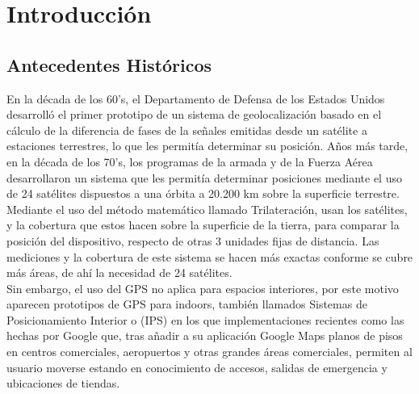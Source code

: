 \chapter{Introducción}

\section{Antecedentes Históricos}

En la década de los 60's, el Departamento de Defensa de los Estados Unidos desarrolló el primer prototipo de un sistema de geolocalización basado en el cálculo de la diferencia de fases de la señales emitidas desde un satélite a estaciones terrestres, lo que les permitía determinar su posición. Años más tarde, en la década de los 70's, los programas de la armada y de la Fuerza Aérea desarrollaron un sistema que les permitía determinar posiciones mediante el uso de 24 satélites dispuestos a una órbita a 20.200 km sobre la superficie terrestre.\\

Mediante el uso del método matemático llamado Trilateración, usan los satélites, y la cobertura que estos hacen sobre la superficie de la tierra, para comparar la posición del dispositivo, respecto de otras 3 unidades fijas de distancia. Las mediciones y la cobertura de este sistema se hacen más exactas conforme se cubre más áreas, de ahí la necesidad de 24 satélites.\\

Sin embargo, el uso del GPS no aplica para espacios interiores, por este motivo aparecen prototipos de GPS para indoors, también llamados Sistemas de Posicionamiento Interior o (\ac{IPS}) en los que implementaciones recientes como las hechas por Google que, tras añadir a su aplicación Google Maps planos de pisos en centros comerciales, aeropuertos y otras grandes áreas comerciales, permiten al usuario moverse estando en conocimiento de accesos, salidas de emergencia y ubicaciones de tiendas. 

